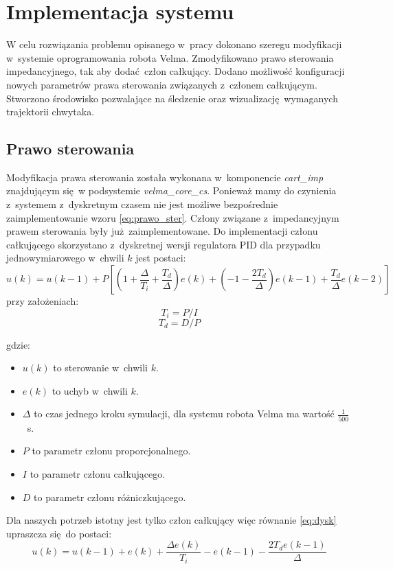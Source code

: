 
\chapter{Implementacja systemu \label{chap:specyfikacja_systemu}}
W celu rozwiązania problemu opisanego w~pracy dokonano szeregu modyfikacji w~systemie oprogramowania robota Velma. Zmodyfikowano prawo sterowania impedancyjnego, tak aby dodać człon całkujący. Dodano możliwość konfiguracji nowych parametrów prawa sterowania związanych z~członem całkującym. Stworzono środowisko pozwalające na śledzenie oraz wizualizację wymaganych trajektorii chwytaka.

\section{Prawo sterowania}
Modyfikacja prawa sterowania została wykonana w~komponencie \textit{cart\_imp} znajdującym się w podsystemie \textit{velma\_core\_cs}. Ponieważ mamy do czynienia z~systemem z~dyskretnym czasem nie jest możliwe bezpośrednie zaimplementowanie wzoru \ref{eq:prawo_ster}. Człony związane z~impedancyjnym prawem sterowania były już zaimplementowane. Do implementacji członu całkującego skorzystano z~dyskretnej wersji regulatora PID \cite{wiki:PID_controller} dla przypadku jednowymiarowego w~chwili $k$ jest postaci:
\begin{equation}
\label{eq:dysk}
u(k) = u(k-1) + P[(1 + \frac{\Delta}{T_i} + \frac{T_d}{\Delta})e(k) + (-1-\frac{2T_d}{\Delta})e(k-1) + \frac{T_d}{\Delta}e(k-2)]
\end{equation}
przy założeniach:
\begin{equation}
T_i = P/I
\end{equation}
\begin{equation}
T_d = D/P
\end{equation}

gdzie:
\begin{itemize}
	\item $u(k)$ to sterowanie w~chwili $k$.
	\item $e(k)$ to uchyb w~chwili $k$.
	\item $\Delta$ to czas jednego kroku symulacji, dla systemu robota Velma ma wartość $\frac{1}{500}$~s.
	\item $P$ to parametr członu proporcjonalnego.
	\item $I$ to parametr członu całkującego.
	\item $D$ to parametr członu różniczkującego.
\end{itemize}
Dla naszych potrzeb istotny jest tylko człon całkujący więc równanie \ref{eq:dysk} upraszcza się do postaci:
\begin{equation}
\label{eq:dysk_cal}
	u(k) = u(k-1) + e(k)+\frac{\Delta e(k)}{T_i} - e(k-1) -\frac{2T_de(k-1)}{\Delta} 
\end{equation}

